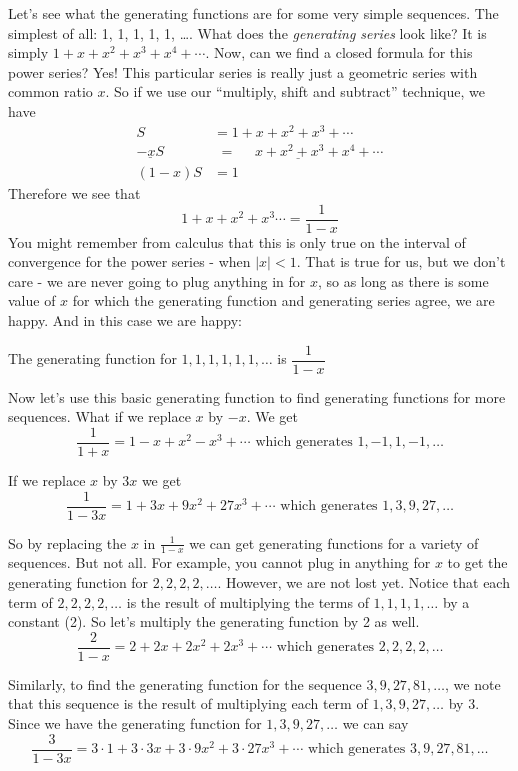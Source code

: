 \documentclass[12pt]{article}
\begin{document}
Let's see what the generating functions are for some very simple sequences.  The simplest of all: 1, 1, 1, 1, 1, \ldots.  What does the {\em generating series} look like?  It is simply $1 + x + x^2 + x^3 + x^4 + \cdots$.  Now, can we find a closed formula for this power series? Yes!  This particular series is really just a geometric series with common ratio $x$.  So if we use our ``multiply, shift and subtract'' technique, we have
 \begin{align*}
  S & = 1 + x + x^2 + x^3 + \cdots \\
  \underline{- xS} & \underline{\,\, = ~~~~~~ x + x^2 + x^3 + x^4 + \cdots} \\
  (1-x)S & = 1
 \end{align*}
Therefore we see that 
 \[1 + x + x^2 + x^3 \cdots = \dfrac{1}{1-x}\]
You might remember from calculus that this is only true on the interval of convergence for the power series - when $|x| < 1$.  That is true for us, but we don't care - we are never going to plug anything in for $x$, so as long as there is some value of $x$ for which the generating function and generating series agree, we are happy. And in this case we are happy:
 \begin{defbox}{}
  The generating function for $1,1,1,1,1,1,\ldots$ is $\dfrac{1}{1-x}$
 \end{defbox}

  Now let's use this basic generating function to find generating functions for more sequences.  What if we replace $x$ by $-x$.  We get 
 \[\frac{1}{1+x} = 1 - x + x^2 - x^3 + \cdots \mbox{ which generates } 1, -1, 1, -1, \ldots\]
 
 If we replace $x$ by $3x$ we get
 \[\frac{1}{1-3x} = 1 + 3x + 9x^2 + 27x^3 + \cdots \mbox{ which generates } 1, 3, 9, 27, \ldots\]
 
 So by replacing the $x$ in $\frac{1}{1-x}$ we can get generating functions for a variety of sequences.  But not all.  For example, you cannot plug in anything for $x$ to get the generating function for $2,2,2,2, \ldots$.  However, we are not lost yet.  Notice that each term of $2, 2, 2, 2, \ldots$ is the result of multiplying the terms of $1, 1, 1, 1, \ldots$ by a constant (2).  So let's multiply the generating function by 2 as well.
 \[\frac{2}{1-x} = 2 + 2x + 2x^2 + 2x^3 + \cdots \mbox{ which generates } 2, 2, 2, 2, \ldots\]
 
Similarly, to find the generating function for the sequence $3, 9, 27, 81, \ldots$, we note that this sequence is the result of multiplying each term of $1, 3, 9, 27, \ldots$ by 3.  Since we have the generating function for $1, 3, 9, 27, \ldots$ we can say
\[\frac{3}{1-3x} = 3\cdot 1 + 3\cdot 3x + 3\cdot 9x^2 + 3\cdot 27x^3 + \cdots \mbox{ which generates } 3, 9, 27, 81, \ldots\]
 
\end{document}
